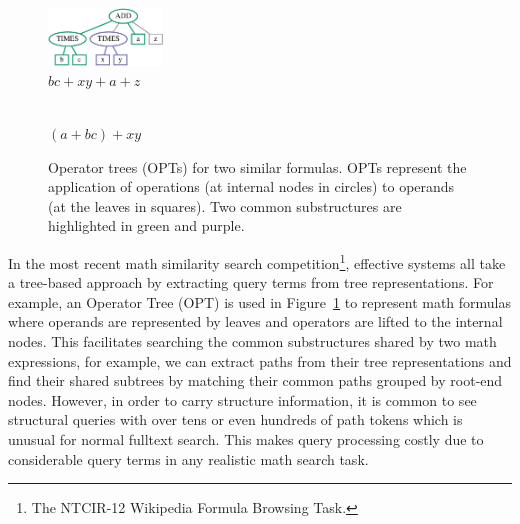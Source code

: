 \documentclass[runningheads]{llncs}
\begin{document}
\begin{figure}[!t]

\begin{center}
\begin{minipage}[b]{1.5in}
\begin{center}
\includegraphics[width=1.2in]{fig/tree3.eps}\\
$bc + xy + a + z$
\end{center}
\end{minipage}
\hspace*{.0in}
\begin{minipage}[b]{1.5in}
\begin{center}
\\
$(a + bc) + xy$
\end{center}
\end{minipage}
\end{center}

\caption{Operator trees (OPTs) for two similar formulas. OPTs represent the application of operations (at internal nodes in circles) to operands (at the leaves in squares). Two common substructures are highlighted in green and purple.}
\label{intro}
\end{figure}

In the most recent math similarity search competition\footnote{The NTCIR-12 Wikipedia Formula Browsing Task.}, effective systems all take a tree-based approach by extracting query terms from tree representations.
For example, an Operator Tree (OPT) is used in Figure~\ref{intro} to represent math formulas where operands are represented by leaves and operators are lifted to the internal nodes.
This facilitates searching the common substructures shared by two math expressions, for example, we can extract paths from their tree representations and find their shared subtrees by matching their common paths grouped by root-end nodes. 
However, in order to carry structure information, it is common to see structural queries with over tens or even hundreds of path tokens which is unusual for normal fulltext search. This makes query processing costly due to considerable query terms in any realistic math search task.
\end{document}
